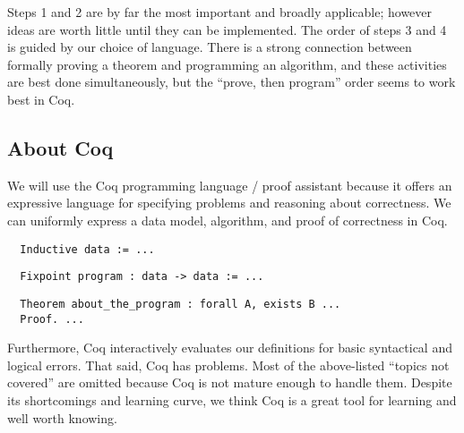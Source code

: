 \documentclass{article}
\begin{document}
Steps 1 and 2 are by far the most important and broadly applicable; however ideas are worth little until they can be implemented.
The order of steps 3 and 4 is guided by our choice of language.
There is a strong connection between formally proving a theorem and programming an algorithm, and these activities are best done simultaneously, but the ``prove, then program'' order seems to work best in Coq.

\subsection*{About Coq}
We will use the Coq programming language / proof assistant because it offers an expressive language for specifying problems and reasoning about correctness.
We can uniformly express a data model, algorithm, and proof of correctness in Coq.

\begin{center}
\begin{verbatim}
  Inductive data := ...
\end{verbatim}
\begin{verbatim}
  Fixpoint program : data -> data := ...
\end{verbatim}
\begin{verbatim}
  Theorem about_the_program : forall A, exists B ... 
  Proof. ...
\end{verbatim}
\end{center}

Furthermore, Coq interactively evaluates our definitions for basic syntactical and logical errors.
That said, Coq has problems.
Most of the above-listed ``topics not covered'' are omitted because Coq is not mature enough to handle them.
Despite its shortcomings and learning curve, we think Coq is a great tool for learning and well worth knowing.
\end{document}
